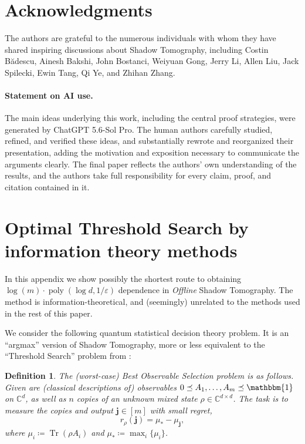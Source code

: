 \documentclass[10pt]{article}
\newcommand{\eps}{\epsilon}
\renewcommand{\epsilon}{\varepsilon}
\let\mathbm\bm
\newcommand{\bj}{\mathbm{j}}
\newcommand{\CC}{\mathbb{C}}
\renewcommand{\bm}{\mathbf{m}}
\DeclareMathOperator{\Tr}{Tr}
\DeclareMathOperator{\poly}{poly}
\newcommand{\Id}{\mathbbm{1}}
\newtheorem{definition}[theorem]{Definition}
\begin{document}
\section*{Acknowledgments}

The authors are grateful to the numerous individuals with whom they have shared inspiring discussions about Shadow Tomography, including Costin B{\u a}descu, Ainesh Bakshi, John Bostanci, Weiyuan Gong, Jerry Li, Allen Liu, Jack Spilecki, Ewin Tang, Qi Ye, and Zhihan Zhang.

\paragraph{Statement on AI use.} The main ideas underlying this work, including the central proof strategies, were generated by ChatGPT 5.6-Sol Pro. The human authors carefully studied, refined, and verified these ideas, and substantially rewrote and reorganized their presentation, adding the motivation and exposition necessary to communicate the arguments clearly. The final paper reflects the authors’ own understanding of the results, and the authors take full responsibility for every claim, proof, and citation contained in it.




\appendix

\section{Optimal Threshold Search by information theory methods}
In this appendix we show possibly the shortest route to obtaining $\log(m)\cdot \poly(\log d, 1/\eps)$ dependence in \emph{Offline} Shadow Tomography.
The method is information-theoretical, and (seemingly) unrelated to the methods used in the rest of this paper.

We consider the following quantum statistical decision theory problem.  It is an ``argmax'' version of Shadow Tomography, more or less equivalent to the ``Threshold Search'' problem from \cite{BO24}:
\begin{definition}
    The (worst-case) \emph{Best Observable Selection} problem is as follows.  Given are (classical descriptions of) observables $0 \preceq A_1, \dots, A_m \preceq \Id$ on $\CC^d$, as well as $n$ copies of an unknown mixed state $\rho \in \CC^{d \times d}$.  The task is to measure the copies and output $\bj \in [m]$ with small \emph{regret},
    \begin{equation}
        r_\rho(\bj) = \mu_* - \mu_{\bj},
    \end{equation}
    where $\mu_i \coloneqq \Tr(\rho A_i)$ and $\mu_* \coloneqq \max_i \{\mu_i\}$.
\end{definition}
\end{document}
